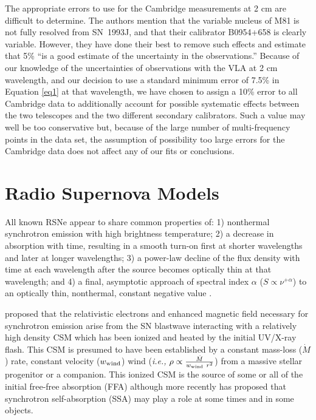 \documentclass[12pt,preprint]{aastex}
\newcommand{\ie}{{\it i.e., }}
\begin{document}
The appropriate errors to use for the Cambridge measurements at 2 cm are difficult to determine. The authors \citep{Pooley93b} mention that the variable nucleus of M81 is not fully resolved from SN~1993J, and that their calibrator B0954+658 is clearly variable. However, they have done their best to remove such effects and estimate that 5\% ``is a good estimate of the uncertainty in the observations.'' Because of our knowledge of the uncertainties of observations with the VLA at 2 cm wavelength, and our decision to use a standard minimum error of 7.5\% in Equation \ref{eq1} at that wavelength, we have chosen to assign a 10\% error to all Cambridge data to additionally account for possible systematic effects between the two telescopes and the two different secondary calibrators. Such a value may well be too conservative but, because of the large number of multi-frequency points in the data set, the assumption of possibility too large errors for the Cambridge data does not affect any of our fits or conclusions.

\section{Radio Supernova Models}

All known RSNe appear to share common properties of: 1) nonthermal
synchrotron emission with high brightness temperature; 2) a decrease in
absorption with time, resulting in a smooth turn-on first at shorter
wavelengths and later at longer wavelengths; 3) a power-law decline of
the flux density with time at each wavelength after the source becomes optically thin at that wavelength; and 4) a final, asymptotic approach of spectral index $\alpha$ ($S \propto
\nu^{+\alpha}$) to an optically thin, nonthermal, constant negative
value \citep{Weiler86,Weiler90}. 

\citet{Chevalier82a,Chevalier82b} proposed that the relativistic
electrons and enhanced magnetic field necessary for synchrotron emission
arise from the SN blastwave interacting with a relatively high density
CSM which has been ionized and heated by the initial UV/X-ray flash. 
This CSM is presumed to have been established by a constant mass-loss
($\dot M$) rate, constant velocity ($w_{\rm wind}$) wind (\ie $\rho
\propto \frac{\dot M}{w_{\rm wind}~r^2}$) from a massive stellar
progenitor or a companion.  This ionized CSM is the source of some or all
of the initial free-free absorption (FFA) although more recently \citet{Chevalier98} has proposed that
synchrotron self-absorption (SSA) may play a role at some times and in some objects.  
\end{document}
